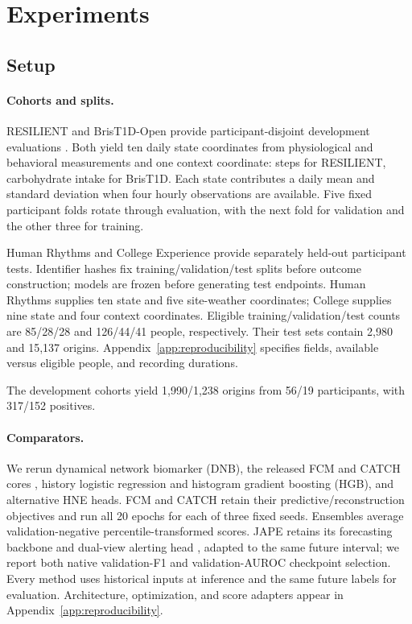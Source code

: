 \section{Experiments}
\subsection{Setup}
\label{sec:experimental-setup}

\begin{table}[t]
\centering
\caption{Development prediction. Neural results average three seeds; CIs use 2,000 participant resamples. Within: mean within-participant AUROC. Bold/underlined: best/second distinct displayed score; gray: HNE.}
\label{tab:main}
\end{table}

\paragraph{Cohorts and splits.}
RESILIENT and BrisT1D-Open provide participant-disjoint development evaluations \citep{hneD02,hneD03,hneD04}. Both yield ten daily state coordinates from physiological and behavioral measurements and one context coordinate: steps for RESILIENT, carbohydrate intake for BrisT1D. Each state contributes a daily mean and standard deviation when four hourly observations are available. Five fixed participant folds rotate through evaluation, with the next fold for validation and the other three for training.

Human Rhythms \citep{hneD07} and College Experience \citep{hneD08} provide separately held-out participant tests. Identifier hashes fix training/validation/test splits before outcome construction; models are frozen before generating test endpoints. Human Rhythms supplies ten state and five site-weather coordinates; College supplies nine state and four context coordinates. Eligible training/validation/test counts are 85/28/28 and 126/44/41 people, respectively. Their test sets contain 2,980 and 15,137 origins. Appendix~\ref{app:reproducibility} specifies fields, available versus eligible people, and recording durations.

The development cohorts yield 1,990/1,238 origins from 56/19 participants, with 317/152 positives.

\paragraph{Comparators.}
We rerun dynamical network biomarker (DNB), the released FCM and CATCH cores \citep{hneH01,hneC01}, history logistic regression and histogram gradient boosting (HGB), and alternative HNE heads. FCM and CATCH retain their predictive/reconstruction objectives and run all 20 epochs for each of three fixed seeds. Ensembles average validation-negative percentile-transformed scores. JAPE retains its forecasting backbone and dual-view alerting head \citep{hneP02}, adapted to the same future interval; we report both native validation-F1 and validation-AUROC checkpoint selection. Every method uses historical inputs at inference and the same future labels for evaluation. Architecture, optimization, and score adapters appear in Appendix~\ref{app:reproducibility}.


